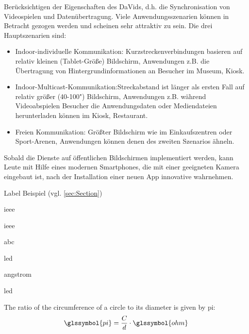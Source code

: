 Berücksichtigen der Eigenschaften des DaVids, d.h. die Synchronisation von Videospielen und Datenübertragung. Viele Anwendungsszenarien können in Betracht gezogen werden und scheinen sehr attraktiv zu sein. Die drei Hauptszenarien sind:

\begin{itemize}
  \item Indoor-individuelle Kommunikation: Kurzstreckenverbindungen basieren auf relativ kleinen (Tablet-Größe) Bildschirm, Anwendungen z.B. die Übertragung von Hintergrundinformationen an Besucher im Museum, Kiosk.
  \item Indoor-Multicast-Kommunikation:Streckabstand ist länger als ersten Fall auf relativ größer (40-100") Bildschirm, Anwendungen z.B. während Videoabspielen Besucher die Anwendungsdaten oder Mediendateien herunterladen können im Kiosk, Restaurant.
  \item Freien Kommunikation: Größter Bildschirm wie im Einkaufszentren oder Sport-Arenen, Anwendungen können denen des zweiten Szenarios ähneln.
\end{itemize}

Sobald die Dienste auf öffentlichen Bildschirmen implementiert werden, kann Leute mit Hilfe eines modernen Smartphones, die mit einer geeigneten Kamera eingebaut ist, nach der Installation einer neuen App innovative wahrnehmen.





















Label Beispiel (vgl. \cref{sec:Section})

\cite{Kammeyer}

\gls{ieee}

\gls{ieee}

\gls{abc}

\gls{led}

 \gls{angstrom}

\gls{led}

The ratio of the circumference of a circle to its diameter is given by \gls{pi}:
\begin{equation}
\glssymbol{pi} = \frac{C}{d} \cdot \glssymbol{ohm}
\end{equation}

